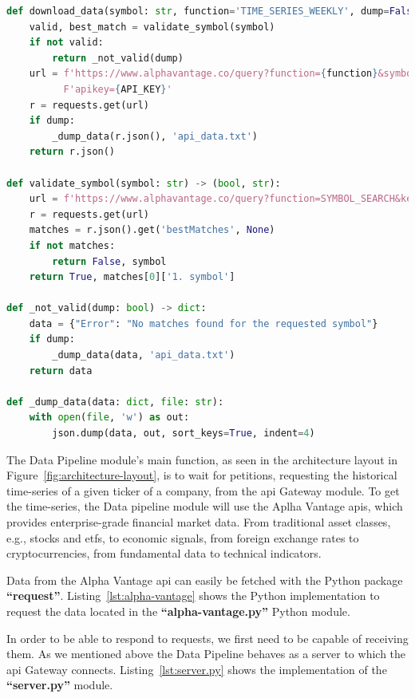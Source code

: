 \begin{lstlisting}[language=python,caption=aplha-vantage.py,label={lst:alpha-vantage}]
def download_data(symbol: str, function='TIME_SERIES_WEEKLY', dump=False) -> dict:
    valid, best_match = validate_symbol(symbol)
    if not valid:
        return _not_valid(dump)
    url = f'https://www.alphavantage.co/query?function={function}&symbol={best_match}&interval=5min&' \
          F'apikey={API_KEY}'
    r = requests.get(url)
    if dump:
        _dump_data(r.json(), 'api_data.txt')
    return r.json()

def validate_symbol(symbol: str) -> (bool, str):
    url = f'https://www.alphavantage.co/query?function=SYMBOL_SEARCH&keywords={symbol}&apikey={API_KEY}'
    r = requests.get(url)
    matches = r.json().get('bestMatches', None)
    if not matches:
        return False, symbol
    return True, matches[0]['1. symbol']

def _not_valid(dump: bool) -> dict:
    data = {"Error": "No matches found for the requested symbol"}
    if dump:
        _dump_data(data, 'api_data.txt')
    return data

def _dump_data(data: dict, file: str):
    with open(file, 'w') as out:
        json.dump(data, out, sort_keys=True, indent=4)
\end{lstlisting}

The Data Pipeline module's main function, as seen in the architecture layout in Figure~\ref{fig:architecture-layout}, is to wait for petitions, requesting the historical time-series of a given ticker of a company, from the \gls{api} Gateway module. To get the time-series, the Data pipeline module will use the Aplha Vantage \glspl{api}, which provides enterprise-grade financial market data. From traditional asset classes, e.g., stocks and \glspl{etf}, to economic signals, from foreign exchange rates to cryptocurrencies, from fundamental data to technical indicators.~\cite{alphaVantage}

Data from the Alpha Vantage \gls{api} can easily be fetched with the Python package \textbf{\enquote{request}}. Listing~\ref{lst:alpha-vantage} shows the Python implementation to request the data located in the \textbf{\enquote{alpha-vantage.py}} Python module.

In order to be able to respond to requests, we first need to be capable of receiving them. As we mentioned above the Data Pipeline behaves as a server to which the \gls{api} Gateway connects. Listing~\ref{lst:server.py} shows the implementation of the \textbf{\enquote{server.py}} module.


